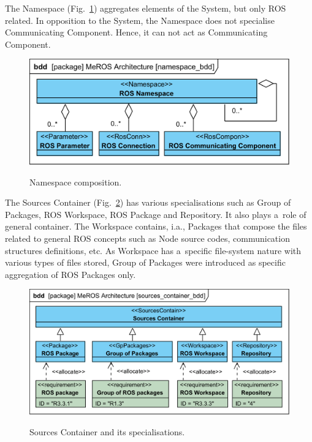 \documentclass[11pt,oneside,a4paper]{report}
\begin{document}
	
	The Namespace (Fig.~\ref{fig:namespace_bdd}) aggregates elements of the System, but only ROS related. In opposition to the System, the Namespace does not specialise Communicating Component. Hence, it can not act as Communicating Component.
	
	
	\begin{figure}[H]
		\centering
		\begin{center}
			{\includegraphics[scale=1.0]{diagrams/namespace_bdd.png}}
		\end{center}
		\caption{Namespace composition.}
		\label{fig:namespace_bdd}
	\end{figure}
	
	The Sources Container (Fig.~\ref{fig:sources_container_bdd}) has various specialisations such as Group of Packages, ROS Workspace, ROS Package and Repository. It also plays a~role of general container.  
	The Workspace contains, i.a., Packages that compose the files related to general ROS concepts such as Node source codes, communication structures definitions, etc. As Workspace has a~specific file-system nature with various types of files stored, Group of Packages were introduced as specific aggregation of ROS Packages only.
	
	
	\begin{figure}[H]
		\centering
		\begin{center}
			{\includegraphics[scale=1.0]{diagrams/sources_container_bdd.png}}
		\end{center}
		\caption{Sources Container and its specialisations.} 
		\label{fig:sources_container_bdd}
	\end{figure}
	
\end{document}
